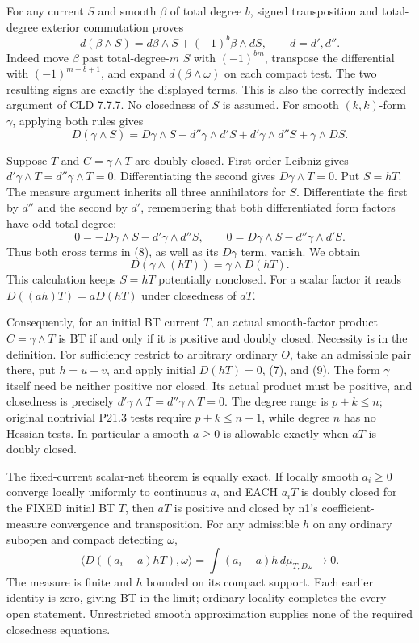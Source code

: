 \documentclass[11pt]{article}
\begin{document}
For any current \(S\) and smooth \(\beta\) of total degree \(b\), signed transposition and total-degree exterior commutation proves
\[
 d(\beta\wedge S)=d\beta\wedge S+(-1)^b\beta\wedge dS,\qquad d=d',d''.
\]
Indeed move \(\beta\) past total-degree-\(m\) \(S\) with \((-1)^{bm}\), transpose the differential with \((-1)^{m+b+1}\), and expand \(d(\beta\wedge\omega)\) on each compact test. The two resulting signs are exactly the displayed terms. This is also the correctly indexed argument of CLD 7.7.7. No closedness of \(S\) is assumed. For smooth \((k,k)\)-form \(\gamma\), applying both rules gives
\[
 D(\gamma\wedge S)=D\gamma\wedge S-d''\gamma\wedge d'S
                  +d'\gamma\wedge d''S+\gamma\wedge DS.                  \tag{8}
\]

Suppose \(T\) and \(C=\gamma\wedge T\) are doubly closed. First-order Leibniz gives \(d'\gamma\wedge T=d''\gamma\wedge T=0\). Differentiating the second gives \(D\gamma\wedge T=0\). Put \(S=hT\). The measure argument inherits all three annihilators for \(S\). Differentiate the first by \(d''\) and the second by \(d'\), remembering that both differentiated form factors have odd total degree:
\[
 0=-D\gamma\wedge S-d'\gamma\wedge d''S,
 \qquad0=D\gamma\wedge S-d''\gamma\wedge d'S.
\]
Thus both cross terms in (8), as well as its \(D\gamma\) term, vanish. We obtain
\[
 D(\gamma\wedge(hT))=\gamma\wedge D(hT).                                  \tag{9}
\]
This calculation keeps \(S=hT\) potentially nonclosed. For a scalar factor it reads \(D((ah)T)=aD(hT)\) under closedness of \(aT\).

Consequently, for an initial BT current \(T\), an actual smooth-factor product \(C=\gamma\wedge T\) is BT if and only if it is positive and doubly closed. Necessity is in the definition. For sufficiency restrict to arbitrary ordinary \(O\), take an admissible pair there, put \(h=u-v\), and apply initial \(D(hT)=0\), (7), and (9). The form \(\gamma\) itself need be neither positive nor closed. Its actual product must be positive, and closedness is precisely \(d'\gamma\wedge T=d''\gamma\wedge T=0\). The degree range is \(p+k\leq n\); original nontrivial P21.3 tests require \(p+k\leq n-1\), while degree \(n\) has no Hessian tests. In particular a smooth \(a\geq0\) is allowable exactly when \(aT\) is doubly closed.

The fixed-current scalar-net theorem is equally exact. If locally smooth \(a_i\geq0\) converge locally uniformly to continuous \(a\), and EACH \(a_iT\) is doubly closed for the FIXED initial BT \(T\), then \(aT\) is positive and closed by n1's coefficient-measure convergence and transposition. For any admissible \(h\) on any ordinary subopen and compact detecting \(\omega\),
\[
 \langle D((a_i-a)hT),\omega\rangle
 =\int(a_i-a)h\,d\mu_{T,D\omega}\longrightarrow0.
\]
The measure is finite and \(h\) bounded on its compact support. Each earlier identity is zero, giving BT in the limit; ordinary locality completes the every-open statement. Unrestricted smooth approximation supplies none of the required closedness equations.
\end{document}
